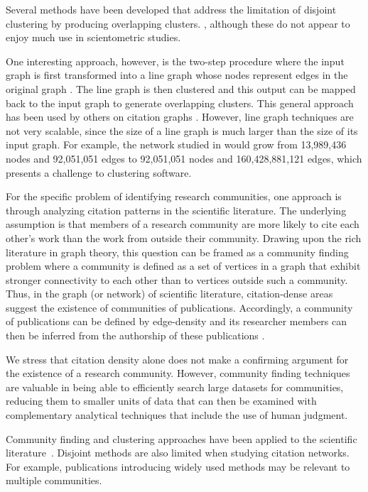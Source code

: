 \documentclass[12pt, oneside]{article}   	%
\begin{document}
Several methods have been developed that address the limitation of disjoint clustering by producing overlapping clusters. \citep{Baumes2005,Palla2005,banerjee2005model,Cleuziou2008,Lancichinetti2009,Lu2012,yang2013overlapping}, although these do not appear to enjoy much use in scientometric studies. 

One interesting approach, however, is the two-step procedure where the input graph is first transformed into a line graph whose nodes represent edges in the original graph \citep{Harary1960}.  The line graph is then clustered and this output can be mapped back to the input graph to generate overlapping clusters. This general approach has been used by others on citation graphs \citep{Evans2009,Havemann2018,Havemann2021}. However, line graph  techniques are not very scalable, since the size of a line graph is much larger than the size of its input graph. For example, the network studied in \cite{Wedell2022} would grow from 13,989,436 nodes and 92,051,051 edges to 92,051,051 nodes and 160,428,881,121 edges, which presents a challenge to clustering software. 
 
For the specific problem of identifying research communities, one approach is through analyzing citation patterns in the scientific literature. The underlying assumption is that members of a research community are more likely to cite each other's work than the work from outside their community. Drawing upon the rich literature in graph theory, this question can be framed as a community finding problem where a community is defined as a set of vertices in a graph that exhibit stronger connectivity to each other than to vertices outside such a community. 
Thus, in the graph (or network) of scientific literature, citation-dense areas suggest the existence of communities of publications. Accordingly, a community of publications can be defined by edge-density and 
its researcher members can then be inferred from the authorship of these publications \citep{Chandrasekharan2021,Wedell2022}. 

We stress that citation density alone does not make a confirming argument for the existence of a research community. However, community finding techniques are valuable in being able to efficiently search large datasets for communities, reducing them to smaller units of data that can then be examined with complementary analytical techniques that include the use of human judgment. 

Community finding and clustering approaches have been applied to the scientific literature~\citep{Newman2006,Fortunato2009,Boyack2010,Boyack2019,Traag2019,Ahlgren2020,Chandrasekharan2021,Wedell2022}. Disjoint methods are also limited when studying citation networks.  For example, publications introducing widely used methods may be relevant to multiple communities.
	
\end{document}
